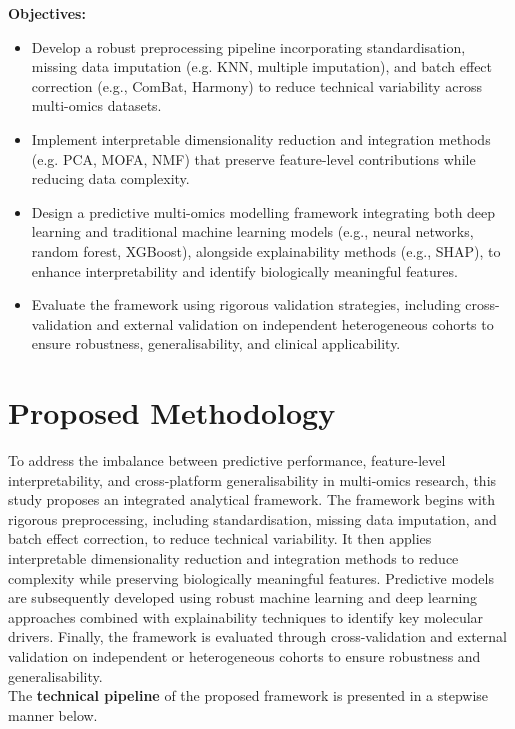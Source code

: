 \documentclass[conference]{IEEEtran}
\begin{document}
\textbf{Objectives:}
\begin{itemize}
    \item Develop a robust preprocessing pipeline incorporating standardisation, missing data imputation (e.g. KNN, multiple imputation), and batch effect correction (e.g., ComBat, Harmony) to reduce technical variability across multi-omics datasets.
    \item Implement interpretable dimensionality reduction and integration methods (e.g. PCA, MOFA, NMF) that preserve feature-level contributions while reducing data complexity.
    \item Design a predictive multi-omics modelling framework integrating both deep learning and traditional machine learning models (e.g., neural networks, random forest, XGBoost), alongside explainability methods (e.g., SHAP), to enhance interpretability and identify biologically meaningful features.
    \item Evaluate the framework using rigorous validation strategies, including cross-validation and external validation on independent heterogeneous cohorts to ensure robustness, generalisability, and clinical applicability.
\end{itemize}

\section{Proposed Methodology}
To address the imbalance between predictive performance, feature-level interpretability, and cross-platform generalisability in multi-omics research, this study proposes an integrated analytical framework. The framework begins with rigorous preprocessing, including standardisation, missing data imputation, and batch effect correction, to reduce technical variability. It then applies interpretable dimensionality reduction and integration methods to reduce complexity while preserving biologically meaningful features. Predictive models are subsequently developed using robust machine learning  and deep learning approaches combined with explainability techniques to identify key molecular drivers. Finally, the framework is evaluated through cross-validation and external validation on independent or heterogeneous cohorts to ensure robustness and generalisability.\\
The \textbf{technical pipeline} of the proposed framework is presented in a stepwise manner below.
\end{document}
